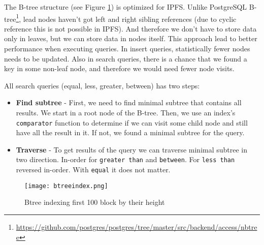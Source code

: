 The B-tree structure (see Figure \ref{btree}) is optimized for IPFS. Unlike PostgreSQL B-tree\footnote{\url{https://github.com/postgres/postgres/tree/master/src/backend/access/nbtree}}, lead nodes haven't got left and right sibling references (due to cyclic reference this is not possible in IPFS). And therefore we don't have to store data only in leaves, but we can store data in nodes itself. This approach lead to better performance when executing queries. In insert queries, statistically fewer nodes needs to be updated. Also in search queries, there is a chance that we found a key in some non-leaf node, and therefore we would need fewer node visits.

All search queries (equal, less, greater, between) has two steps:
\begin{itemize}
    \item \textbf{Find subtree} - First, we need to find minimal subtree that contains all results. We start in a root node of the B-tree. Then, we use an index's \texttt{comparator} function to determine if we can visit some child node and still have all the result in it. If not, we found a minimal subtree for the query.
    \item \textbf{Traverse} - To get results of the query we can traverse minimal subtree in two direction. In-order for \texttt{greater than} and \texttt{between}. For \texttt{less than} reversed in-order. With \texttt{equal} it does not matter.
\end{itemize}

\begin{figure}[h]
    \centering
    \texttt{[image: btreeindex.png]}
    \caption{Btree indexing first 100 block by their height}
    \label{btree}
\end{figure}

